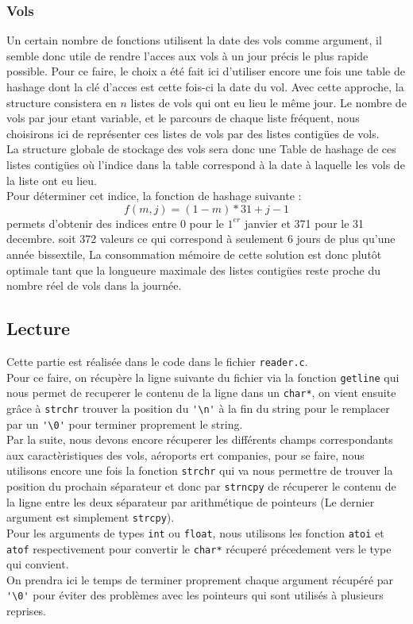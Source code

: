 \documentclass[a4paper, 12pt]{article}
\begin{document}
	\subsubsection{Vols}
	Un certain nombre de fonctions utilisent la date des vols comme argument, il semble donc utile de rendre l'acces aux vols à un jour précis le plus rapide possible. Pour ce faire, le choix a été fait ici d'utiliser encore une fois une table de hashage dont la clé d'acces est cette fois-ci la date du vol. Avec cette approche, la structure consistera en $n$ listes de vols qui ont eu lieu le même jour. Le nombre de vols par jour etant variable, et le parcours de chaque liste fréquent, nous choisirons ici de représenter ces listes de vols par des listes contigües de vols.\\
	La structure globale de stockage des vols sera donc une Table de hashage de ces listes contigües où l'indice dans la table correspond à la date à laquelle les vols de la liste ont eu lieu.\\
	Pour déterminer cet indice, la fonction de hashage suivante :\\
	\begin{equation}
		f(m, j) = (1-m)*31 + j -1
	\end{equation}
	permets d'obtenir des indices entre 0 pour le $1^{er}$ janvier et 371 pour le 31 decembre. soit 372 valeurs ce qui correspond à seulement 6 jours de plus qu'une année bissextile, La consommation mémoire de cette solution est donc plutôt optimale tant que la longueure maximale des listes contigües reste proche du nombre réel de vols dans la journée.\\
	
	\subsection{Lecture}
	Cette partie est réalisée dans le code dans le fichier \lstinline|reader.c|.\\
	Pour ce faire, on récupère la ligne suivante du fichier via la fonction \verb*|getline| qui nous permet de recuperer le contenu de la ligne dans un \lstinline|char*|, on vient ensuite grâce à \verb*|strchr| trouver la position du \lstinline|'\n'| à la fin du string pour le remplacer par un \lstinline|'\0'| pour terminer proprement le string.\\
	Par la suite, nous devons encore récuperer les différents champs correspondants aux caractèristiques des vols, aéroports ert companies, pour se faire, nous utilisons encore une fois la fonction \verb|strchr| qui va nous permettre de trouver la position du prochain séparateur et donc par \verb*|strncpy| de récuperer le contenu de la ligne entre les deux séparateur par arithmétique de pointeurs (Le dernier argument est simplement \verb*|strcpy|).\\
	Pour les arguments de types \lstinline|int| ou \lstinline|float|, nous utilisons les fonction \verb*|atoi| et \verb*|atof| respectivement pour convertir le \lstinline|char*| récuperé précedement vers le type qui convient.\\
	On prendra ici le temps de terminer proprement chaque argument récupéré par \lstinline|'\0'| pour éviter des problèmes avec les pointeurs qui sont utilisés à plusieurs reprises.
	
\end{document}
